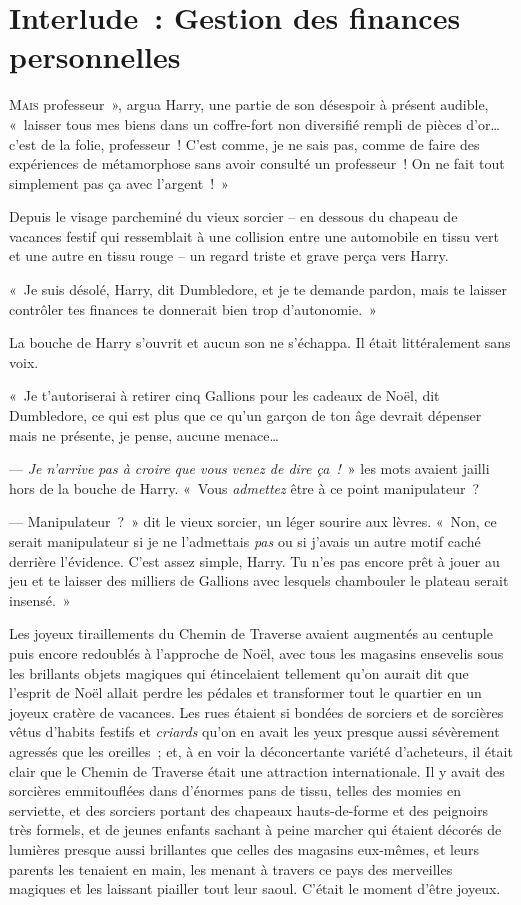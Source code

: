 \chapter{Interlude~: Gestion des finances personnelles}

\lettrine[ante=«~]{M}{ais} professeur~», argua Harry, une partie de son désespoir à présent audible, «~laisser tous mes biens dans un coffre-fort non diversifié rempli de pièces d'or… c'est de la folie, professeur~! C'est comme, je ne sais pas, comme de faire des expériences de métamorphose sans avoir consulté un professeur~! On ne fait tout simplement pas ça avec l'argent~!~»

Depuis le visage parcheminé du vieux sorcier -- en dessous du chapeau de vacances festif qui ressemblait à une collision entre une automobile en tissu vert et une autre en tissu rouge -- un regard triste et grave perça vers Harry.

«~Je suis désolé, Harry, dit Dumbledore, et je te demande pardon, mais te laisser contrôler tes finances te donnerait bien trop d'autonomie.~»

La bouche de Harry s'ouvrit et aucun son ne s'échappa. Il était littéralement sans voix.

«~Je t'autoriserai à retirer cinq Gallions pour les cadeaux de Noël, dit Dumbledore, ce qui est plus que ce qu'un garçon de ton âge devrait dépenser mais ne présente, je pense, aucune menace…

--- \emph{Je n'arrive pas à croire que vous venez de dire ça~!}~» les mots avaient jailli hors de la bouche de Harry. «~Vous \emph{admettez} être à ce point manipulateur~?

--- Manipulateur~?~» dit le vieux sorcier, un léger sourire aux lèvres. «~Non, ce serait manipulateur si je ne l'admettais \emph{pas} ou si j'avais un autre motif caché derrière l'évidence. C'est assez simple, Harry. Tu n'es pas encore prêt à jouer au jeu et te laisser des milliers de Gallions avec lesquels chambouler le plateau serait insensé.~»

\later

Les joyeux tiraillements du Chemin de Traverse avaient augmentés au centuple puis encore redoublés à l'approche de Noël, avec tous les magasins ensevelis sous les brillants objets magiques qui étincelaient tellement qu'on aurait dit que l'esprit de Noël allait perdre les pédales et transformer tout le quartier en un joyeux cratère de vacances. Les rues étaient si bondées de sorciers et de sorcières vêtus d'habits festifs et \emph{criards} qu'on en avait les yeux presque aussi sévèrement agressés que les oreilles~; et, à en voir la déconcertante variété d'acheteurs, il était clair que le Chemin de Traverse était une attraction internationale. Il y avait des sorcières emmitouflées dans d'énormes pans de tissu, telles des momies en serviette, et des sorciers portant des chapeaux hauts-de-forme et des peignoirs très formels, et de jeunes enfants sachant à peine marcher qui étaient décorés de lumières presque aussi brillantes que celles des magasins eux-mêmes, et leurs parents les tenaient en main, les menant à travers ce pays des merveilles magiques et les laissant piailler tout leur saoul. C'était le moment d'être joyeux.

